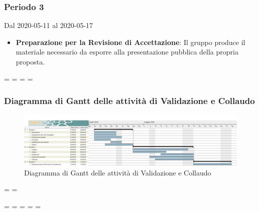\subsubsection{Periodo 3} 
Dal 2020-05-11 al 2020-05-17
\begin{itemize}
	\item \textbf{Preparazione per la Revisione di Accettazione}: Il gruppo produce il materiale necessario da esporre alla presentazione pubblica della propria proposta.
\end{itemize}

\newpage
\paperwidth=\pdfpageheight
\paperheight=\pdfpagewidth
\pdfpageheight=\paperheight
\pdfpagewidth=\paperwidth

\begingroup 
\subsubsection{Diagramma di Gantt delle attività di Validazione e Collaudo}
\pagestyle{empty}
\begin{figure}[h]
	\centering
	\includegraphics[scale=0.39]{Sezioni/DiagrammiGantt/Validazione.png}
	\caption{Diagramma di Gantt delle attività di Validazione e Collaudo}
\end{figure}

\textwidth=\hsize
\textheight=\vsize

\endgroup
\newpage
\paperwidth=\pdfpageheight
\paperheight=\pdfpagewidth
\pdfpageheight=\paperheight
\pdfpagewidth=\paperwidth
\headwidth=\textwidth

\clearpage